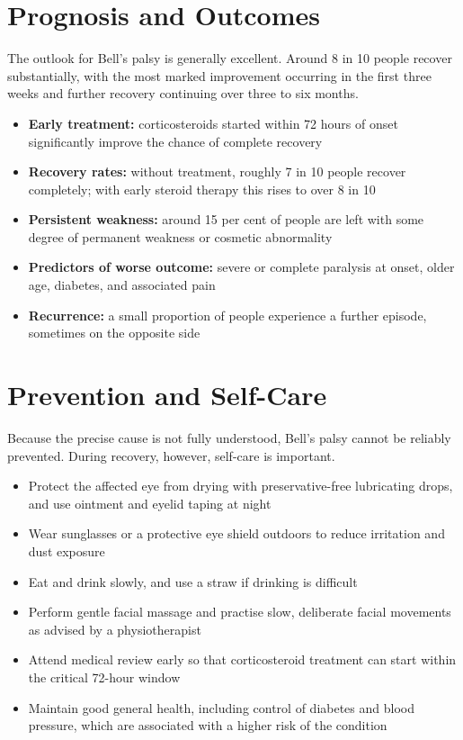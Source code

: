 \section*{Prognosis and Outcomes}
The outlook for Bell's palsy is generally excellent. Around 8 in 10 people recover substantially, with the most marked improvement occurring in the first three weeks and further recovery continuing over three to six months.

\begin{itemize}
    \item \textbf{Early treatment:} corticosteroids started within 72 hours of onset significantly improve the chance of complete recovery
    \item \textbf{Recovery rates:} without treatment, roughly 7 in 10 people recover completely; with early steroid therapy this rises to over 8 in 10
    \item \textbf{Persistent weakness:} around 15 per cent of people are left with some degree of permanent weakness or cosmetic abnormality
    \item \textbf{Predictors of worse outcome:} severe or complete paralysis at onset, older age, diabetes, and associated pain
    \item \textbf{Recurrence:} a small proportion of people experience a further episode, sometimes on the opposite side
\end{itemize}

\section*{Prevention and Self-Care}
Because the precise cause is not fully understood, Bell's palsy cannot be reliably prevented. During recovery, however, self-care is important.

\begin{itemize}
    \item Protect the affected eye from drying with preservative-free lubricating drops, and use ointment and eyelid taping at night
    \item Wear sunglasses or a protective eye shield outdoors to reduce irritation and dust exposure
    \item Eat and drink slowly, and use a straw if drinking is difficult
    \item Perform gentle facial massage and practise slow, deliberate facial movements as advised by a physiotherapist
    \item Attend medical review early so that corticosteroid treatment can start within the critical 72-hour window
    \item Maintain good general health, including control of diabetes and blood pressure, which are associated with a higher risk of the condition
\end{itemize}

